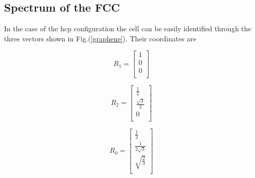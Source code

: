 \documentclass[a4paper]{article}
\begin{document}
\subsection{Spectrum of the FCC}

In the case of the hcp configuration the cell can be easily identified through the three vectors shown in Fig.(\ref{graphene}). Their coordinates are \\
\begin{minipage}{0.3\textwidth}
\centering
\begin{equation*}
R_1 =
\begin{bmatrix}
	1 \\
    0 \\
    0 \\
    
\end{bmatrix}
\end{equation*}

\end{minipage}
\begin{minipage}{0.3\textwidth}
\centering
\begin{equation*}
R_2 =
\begin{bmatrix}
    \frac{1}{2} \\
    \frac{\sqrt{3}}{2}  \\
    0 \\
\end{bmatrix}
\end{equation*}
\end{minipage}
\begin{minipage}{0.3\textwidth}
\centering
\begin{equation*}
R_0 =
\begin{bmatrix}
    \frac{1}{2} \\
    \frac{1}{2\sqrt{3}}  \\
    \sqrt{\frac{2}{3}} \\
\end{bmatrix}
\end{equation*}
\end{minipage}
\end{document}
